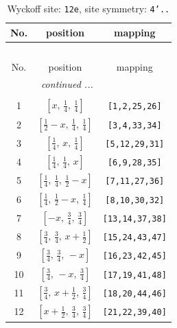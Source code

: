 \documentclass[fleqn,8pt]{jsarticle}
\begin{document}
\begin{longtable}{ccc}
\caption{Wyckoff site: {\tt 12e}, site symmetry: {\tt 4'..}}
 \\
 \hline \hline
No. & position & mapping \\ \hline \endfirsthead

\multicolumn{2}{l}{\tablename\ \thetable{}} \\
 \hline \hline
No. & position & mapping \\ \hline \endhead

 \hline \hline
\multicolumn{2}{r}{\footnotesize\it continued ...} \\ \endfoot

 \hline \hline
\multicolumn{2}{r}{} \\ \endlastfoot

1 & $\left[ x,\, \frac{1}{4},\, \frac{1}{4} \right]$ & {\tt [1,2,25,26]} \\ \hline
2 & $\left[ \frac{1}{2} - x,\, \frac{1}{4},\, \frac{1}{4} \right]$ & {\tt [3,4,33,34]} \\ \hline
3 & $\left[ \frac{1}{4},\, x,\, \frac{1}{4} \right]$ & {\tt [5,12,29,31]} \\ \hline
4 & $\left[ \frac{1}{4},\, \frac{1}{4},\, x \right]$ & {\tt [6,9,28,35]} \\ \hline
5 & $\left[ \frac{1}{4},\, \frac{1}{4},\, \frac{1}{2} - x \right]$ & {\tt [7,11,27,36]} \\ \hline
6 & $\left[ \frac{1}{4},\, \frac{1}{2} - x,\, \frac{1}{4} \right]$ & {\tt [8,10,30,32]} \\ \hline
7 & $\left[ - x,\, \frac{3}{4},\, \frac{3}{4} \right]$ & {\tt [13,14,37,38]} \\ \hline
8 & $\left[ \frac{3}{4},\, \frac{3}{4},\, x + \frac{1}{2} \right]$ & {\tt [15,24,43,47]} \\ \hline
9 & $\left[ \frac{3}{4},\, \frac{3}{4},\, - x \right]$ & {\tt [16,23,42,45]} \\ \hline
10 & $\left[ \frac{3}{4},\, - x,\, \frac{3}{4} \right]$ & {\tt [17,19,41,48]} \\ \hline
11 & $\left[ \frac{3}{4},\, x + \frac{1}{2},\, \frac{3}{4} \right]$ & {\tt [18,20,44,46]} \\ \hline
12 & $\left[ x + \frac{1}{2},\, \frac{3}{4},\, \frac{3}{4} \right]$ & {\tt [21,22,39,40]} \\
\end{longtable}
\renewcommand{\arraystretch}{1.2}
\end{document}

